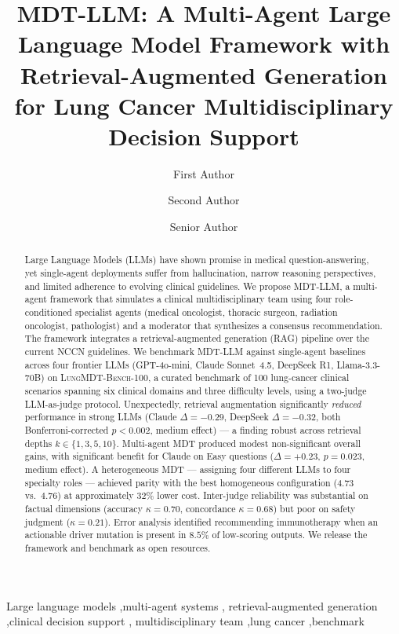 \documentclass[final, 11pt, 3p]{elsarticle}
\newcommand{\MDTLLM}{\textsc{MDT-LLM}}
\newcommand{\BENCH}{\textsc{LungMDT-Bench-100}}
\newcommand{\Delt}[1]{$\Delta{=}#1$}
\begin{document}
\begin{frontmatter}

\title{MDT-LLM: A Multi-Agent Large Language Model Framework with
Retrieval-Augmented Generation for Lung Cancer Multidisciplinary
Decision Support}

\author[aff1]{First Author}
\author[aff1,aff2]{Second Author}
\author[aff1]{Senior Author}


\address[aff1]{Department of [Computer Science / Oncology], [Institution], [City, Country]}
\address[aff2]{Department of Thoracic Oncology, [Hospital], [City, Country]}

\begin{abstract}
Large Language Models (LLMs) have shown promise in medical
question-answering, yet single-agent deployments suffer from hallucination,
narrow reasoning perspectives, and limited adherence to evolving
clinical guidelines. We propose \MDTLLM, a multi-agent framework that
simulates a clinical multidisciplinary team using four role-conditioned
specialist agents (medical oncologist, thoracic surgeon, radiation
oncologist, pathologist) and a moderator that synthesizes a consensus
recommendation. The framework integrates a retrieval-augmented generation
(RAG) pipeline over the current NCCN guidelines. We benchmark \MDTLLM{}
against single-agent baselines across four frontier LLMs (GPT-4o-mini,
Claude Sonnet~4.5, DeepSeek R1, Llama-3.3-70B) on \BENCH, a curated
benchmark of 100 lung-cancer clinical scenarios spanning six clinical
domains and three difficulty levels, using a two-judge LLM-as-judge
protocol. Unexpectedly, retrieval augmentation significantly \emph{reduced}
performance in strong LLMs (Claude \Delt{-0.29}, DeepSeek \Delt{-0.32},
both Bonferroni-corrected $p<0.002$, medium effect) --- a finding robust
across retrieval depths $k\in\{1,3,5,10\}$. Multi-agent MDT produced
modest non-significant overall gains, with significant benefit for Claude
on Easy questions (\Delt{+0.23}, $p{=}0.023$, medium effect). A
heterogeneous MDT --- assigning four different LLMs to four specialty
roles --- achieved parity with the best homogeneous configuration
(4.73 vs.\ 4.76) at approximately $32\%$ lower cost. Inter-judge
reliability was substantial on factual dimensions (accuracy $\kappa{=}0.70$,
concordance $\kappa{=}0.68$) but poor on safety judgment ($\kappa{=}0.21$).
Error analysis identified recommending immunotherapy when an actionable
driver mutation is present in $8.5\%$ of low-scoring outputs. We release
the framework and benchmark as open resources.
\end{abstract}

\begin{keyword}
Large language models \sep multi-agent systems \sep
retrieval-augmented generation \sep clinical decision support \sep
multidisciplinary team \sep lung cancer \sep benchmark
\end{keyword}

\end{frontmatter}
\end{document}
